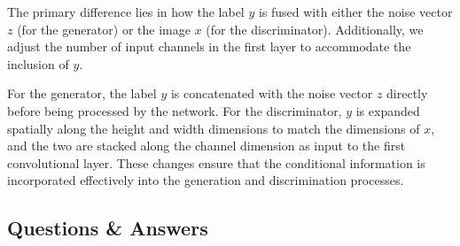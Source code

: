 \documentclass{rapportECL}
\begin{document}
The primary difference lies in how the label $y$ is fused with either the noise vector $z$ (for the generator) or the image $x$ (for the discriminator). Additionally, we adjust the number of input channels in the first layer to accommodate the inclusion of $y$.

For the generator, the label $y$ is concatenated with the noise vector $z$ directly before being processed by the network. For the discriminator, $y$ is expanded spatially along the height and width dimensions to match the dimensions of $x$, and the two are stacked along the channel dimension as input to the first convolutional layer. These changes ensure that the conditional information is incorporated effectively into the generation and discrimination processes.

\subsection{Questions \& Answers}
\end{document}
